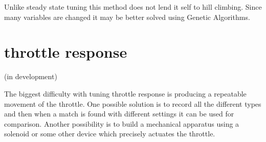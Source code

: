\documentclass{article}
\begin{document}
Unlike steady state tuning this method does not lend it self to hill climbing.
Since many variables are changed it may be better solved using Genetic Algorithms.

\section{throttle response}
(in development)

The biggest difficulty with tuning throttle response is producing
a repeatable movement of the throttle.
One possible solution is to record all the different types and then
when a match is found with different settings it can be used for
comparison.
Another possibility is to build a mechanical apparatus using a solenoid
or some other device which precisely actuates the throttle.

\pagebreak

%
%
%


\end{document}
